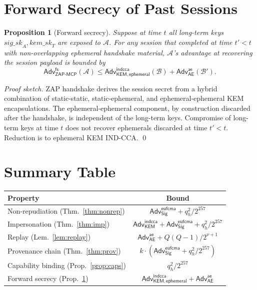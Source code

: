 \documentclass[11pt,a4paper]{article}
\newtheorem{proposition}[theorem]{Proposition}
\theoremstyle{definition}
\theoremstyle{remark}
\newcommand{\zap}{\textsf{ZAP}\xspace}
\newcommand{\zapmcp}{\textsf{ZAP-MCP}\xspace}
\newcommand{\Adv}{\mathsf{Adv}}
\newcommand{\AEAD}{\textsf{AE}}
\newcommand{\KEM}{\textsf{KEM}}
\newcommand{\Sign}{\textsf{Sig}}
\begin{document}
\section{Forward Secrecy of Past Sessions}

\begin{proposition}[Forward secrecy]\label{prop:fs}
Suppose at time $t$ all long-term keys
$\mathit{sig\_sk}_A, \mathit{kem\_sk}_T$ are exposed to $\mathcal{A}$.
For any session that completed at time $t' < t$ with non-overlapping
ephemeral handshake material, $\mathcal{A}$'s advantage at recovering
the session payload is bounded by
\[
\Adv^{\mathsf{fs}}_{\zapmcp{}}(\mathcal{A}) \leq
\Adv^{\mathsf{indcca}}_{\KEM,\mathsf{ephemeral}}(\mathcal{B})
+ \Adv^{\mathsf{ae}}_{\AEAD}(\mathcal{B}').
\]
\end{proposition}

\begin{proof}[Proof sketch]
\zap{} handshake derives the session secret from a hybrid combination
of static-static, static-ephemeral, and ephemeral-ephemeral KEM
encapsulations. The ephemeral-ephemeral component, by construction
discarded after the handshake, is independent of the long-term keys.
Compromise of long-term keys at time $t$ does not recover ephemerals
discarded at time $t' < t$. Reduction is to ephemeral KEM IND-CCA.
\qed
\end{proof}

\section{Summary Table}

\begin{table}[h]
\centering
\small
\renewcommand{\arraystretch}{1.2}
\begin{tabular}{|l|c|}
\hline
\textbf{Property} & \textbf{Bound} \\
\hline
Non-repudiation (Thm.~\ref{thm:nonrep})       & $\Adv^{\mathsf{eufcma}}_{\Sign} + q_h^2/2^{257}$ \\
Impersonation (Thm.~\ref{thm:imp})            & $\Adv^{\mathsf{indcca}}_{\KEM} + \Adv^{\mathsf{eufcma}}_{\Sign} + q_h^2/2^{257}$ \\
Replay (Lem.~\ref{lem:replay})                & $\Adv^{\mathsf{ae}}_{\AEAD} + Q(Q-1)/2^{\nu+1}$ \\
Provenance chain (Thm.~\ref{thm:prov})        & $k \cdot \left(\Adv^{\mathsf{eufcma}}_{\Sign} + q_h^2/2^{257}\right)$ \\
Capability binding (Prop.~\ref{prop:caps})    & $q_h^2/2^{257}$ \\
Forward secrecy (Prop.~\ref{prop:fs})         & $\Adv^{\mathsf{indcca}}_{\KEM,\mathsf{ephemeral}} + \Adv^{\mathsf{ae}}_{\AEAD}$ \\
\hline
\end{tabular}
\end{table}
\end{document}
